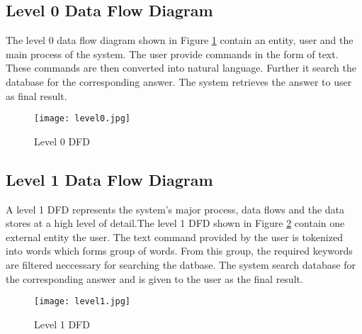 \subsection*{Level 0 Data Flow Diagram}
The level 0 data flow diagram shown in Figure \ref{fig:level0} contain an entity, user and the main process of the system. The user provide commands in the form of text. These commands are then converted into natural language. Further it search the database for the corresponding answer. The system retrieves the answer to user as final result.  
\begin{center}

\begin{figure}[!h]
  \hspace{2cm}
  \texttt{[image: level0.jpg]} 
  \caption{Level 0 DFD}
  \label{fig:level0}
\end{figure}
\end{center}

\subsection*{Level 1 Data Flow Diagram}
A level 1 DFD represents the system's major process, data flows and the data stores at a high level of detail.The level 1 DFD shown in Figure \ref{fig:level1} contain one external entity the user. The text command provided by the user is tokenized into words which forms group of words. From this group, the required keywords are filtered neccessary for searching the datbase. The system search database for the corresponding answer and is given to the user as the final result.
\begin{figure}[!h]
  \texttt{[image: level1.jpg]}
  \caption{Level 1 DFD}
  \label{fig:level1}
\end{figure}


\newpage
